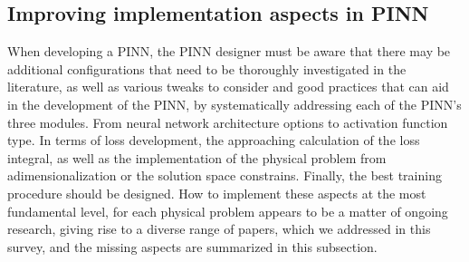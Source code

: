 \documentclass[pdflatex,sn-basic]{sn-jnl}%
\theoremstyle{thmstyleone}%
\theoremstyle{thmstyletwo}%
\theoremstyle{thmstylethree}%
\begin{document}
\subsection{Improving implementation aspects in PINN} 
When developing a PINN, the PINN designer must be aware that there may be additional configurations that need to be thoroughly investigated in the literature, as well as various tweaks to consider and good practices that can aid in the development of the PINN, by systematically addressing each of the PINN's three modules.
%
From neural network architecture options to activation function type.
In terms of loss development, the approaching calculation of the loss integral, as well as the implementation of the physical problem from adimensionalization  or the solution space constrains.
Finally, the best training procedure should be designed.
%
How to implement these aspects at the most fundamental level, for each physical problem appears to be a matter of ongoing research, giving rise to a diverse range of papers,  which we addressed in this survey, and the missing aspects are summarized in this subsection. 



\end{document}
